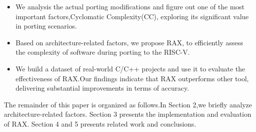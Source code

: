 \documentclass[sigconf,screen,review,anonymous]{acmart}
\begin{document}
\begin{itemize}
  \item We analysis the actual porting modifications and figure out one of the most important factors,Cyclomatic Complexity(CC), exploring its significant value in porting scenarios.
  \item Based on architecture-related factors, we propose RAX, to efficiently assess the complexity of software during porting to the RISC-V.
  \item We build a dataset of real-world C/C++ projects and use it to evaluate the effectiveness of RAX.Our findings indicate that RAX outperforms other tool, delivering substantial improvements in terms of accuracy.
\end{itemize}
The remainder of this paper is organized as follows.In Section 2,we briefly analyze architecture-related factors. Section 3 presents the implementation and evaluation of RAX. Section 4 and 5 presents related work and conclusions.

\end{document}
